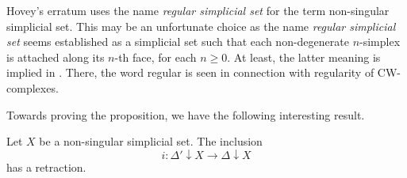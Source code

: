 Hovey's erratum uses the name \emph{regular simplicial set} for the term non-singular simplicial set. This may be an unfortunate choice as the name \emph{regular simplicial set} seems established as a simplicial set such that each non-degenerate $n$-simplex is attached along its $n$-th face, for each $n\geq 0$. At least, the latter meaning is implied in \cite{FP90}. There, the word regular is seen in connection with regularity of CW-complexes.

Towards proving the proposition, we have the following interesting result.
\begin{lemma}
\label{lem:non-degenerate_simplices_reflective_subcategory_non-singular}
Let $X$ be a non-singular simplicial set. The inclusion
\[i:\Delta '\downarrow X\to \Delta \downarrow X\]
has a retraction.
\end{lemma}
